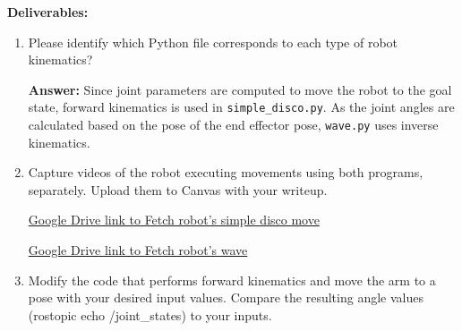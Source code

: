 \documentclass[12pt]{article}
\begin{document}
\textbf{Deliverables:}
\begin{enumerate}
    \item Please identify which Python file corresponds to each type of robot kinematics?
    
    \textbf{Answer: }Since joint parameters are computed to move the robot to the goal state, forward kinematics is used in \texttt{simple_disco.py}. As the joint angles are calculated based on the pose of the end effector pose, \texttt{wave.py} uses inverse kinematics.
    
    \item Capture videos of the robot executing movements using both programs, separately. Upload them to Canvas with your writeup.
    
    \href{https://drive.google.com/file/d/1H86M7AIZrIzaGf10TJZ2XOMb_82X7bvc/view?usp=share_link}{Google Drive link to Fetch robot's simple disco move}
    
    \href{https://drive.google.com/file/d/1LZxnhGoDjbbZgD3olirweqn8HGhDH6gI/view?usp=share_link}{Google Drive link to Fetch robot's wave}
    
    \item Modify the code that performs forward kinematics and move the arm to a pose with your desired input values. Compare the resulting angle values (rostopic echo /joint\_states) to your inputs.


\end{enumerate}
\end{document}
